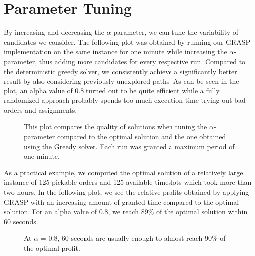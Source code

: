 \documentclass{article}
\begin{document}
\section{Parameter Tuning}
By increasing and decreasing the $\alpha$-parameter, we can tune the variability of candidates we consider. The following plot was obtained by running our GRASP implementation on the same instance for one minute while increasing the  $\alpha$-parameter, thus adding more candidates for every respective run. Compared to the deterministic greedy solver, we consistently achieve a significantly better result by also considering previously unexplored paths. As can be seen in the plot, an alpha value of 0.8 turned out to be quite efficient while a fully randomized approach probably spends too much execution time trying out bad orders and assignments.

\begin{figure}[H]
\centering
\resizebox{0.54\textwidth}{!}{%
    
}
\caption[Parameter Tuning]{This plot compares the quality of solutions when tuning the $\alpha$-parameter compared to the optimal solution and the one obtained using the Greedy solver. Each run was granted a maximum period of one minute.}
\label{fig:a_tuning}
\end{figure}

As a practical example, we computed the optimal solution of a relatively large instance of 125 pickable orders and 125 available timeslots which took more than two hours. In the following plot, we see the relative profits obtained by applying GRASP with an increasing amount of granted time compared to the optimal solution. For an alpha value of 0.8, we reach 89\% of the optimal solution within 60 seconds.
\begin{figure}[H]
\centering

\caption[Performance of GRASP as a function of time]{At $\alpha$ = 0.8, 60 seconds are usually enough to almost reach 90\% of the optimal profit.}
\label{fig:time_grasp}
\end{figure}
\end{document}
